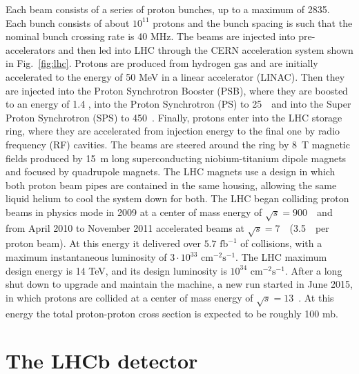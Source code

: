 Each beam consists of a series of proton bunches, up to a maximum of 2835. Each bunch consists of about $10^{11}$
protons and the bunch spacing is such that the nominal bunch crossing rate is 40 MHz. The beams are injected into
pre-accelerators and then led into LHC through the CERN acceleration system shown in Fig.~\ref{fig:lhc}. Protons are
produced from hydrogen gas and are initially accelerated to the energy of 50 MeV in a linear accelerator (LINAC).
Then they are injected into the Proton Synchrotron Booster (PSB), where they are boosted to an energy of 1.4 \gev,
into the Proton Synchrotron (PS) to 25~\gev~and into the Super Proton Synchrotron (SPS) to 450~\gev. Finally, protons
enter into the LHC storage ring, where they are accelerated from injection energy to the final one
by radio frequency (RF) cavities. The beams are steered around the ring by 8~T magnetic fields produced by 15~m long
superconducting niobium-titanium dipole magnets and focused by quadrupole magnets. The LHC magnets
use a design in which both proton beam pipes are contained in the same housing, allowing the same liquid helium to cool 
the system down for both. The LHC began colliding proton beams in physics mode in 2009 at a center of mass
energy of $\sqrt{s} = 900$~\gev~and from April 2010 to November 2011 accelerated beams at $\sqrt{s} = 7$~\tev~(3.5~\tev~per
proton beam). At this energy it delivered over $5.7 \text{ fb}^{-1}$ of collisions, with a maximum instantaneous
luminosity of $3\cdot10^{33} \text{ cm}^{-2}\text{s}^{-1}$. The LHC maximum design energy is 14 TeV, and its design
luminosity is $10^{34} \text{ cm}^{-2}\text{s}^{-1}$. After a long shut down to upgrade and maintain the machine, a
new run started in June 2015, in which protons are collided at a center of mass energy of $\sqrt{s} = 13$~\tev. At this
energy the total proton-proton cross section is expected to be roughly 100 mb.

\section{The LHCb detector}

